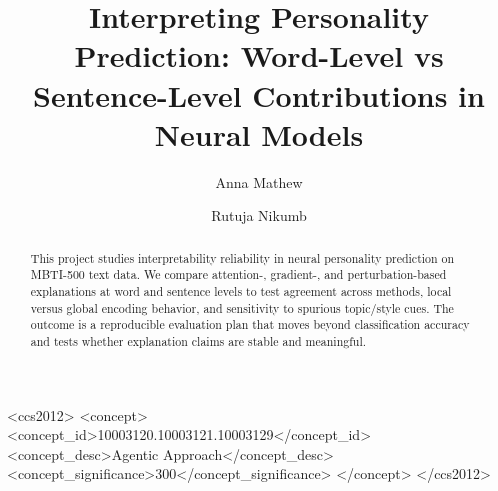 \documentclass[sigplan,screen]{acmart}
\begin{document}
\title[Interpreting Personality Prediction]{Interpreting Personality Prediction: Word-Level vs Sentence-Level Contributions in Neural Models}


\author{Anna Mathew}
\author{Rutuja Nikumb}


\renewcommand{\shortauthors}{Anna Mathew and Rutuja Nikumb}



\begin{abstract}
This project studies interpretability reliability in neural personality prediction on MBTI-500 text data. We compare attention-, gradient-, and perturbation-based explanations at word and sentence levels to test agreement across methods, local versus global encoding behavior, and sensitivity to spurious topic/style cues. The outcome is a reproducible evaluation plan that moves beyond classification accuracy and tests whether explanation claims are stable and meaningful.
\end{abstract}

\begin{CCSXML}
<ccs2012>
 <concept>
  <concept_id>10003120.10003121.10003129</concept_id>
  <concept_desc>Agentic Approach</concept_desc>
  <concept_significance>300</concept_significance>
 </concept>
</ccs2012>
\end{CCSXML}
\end{document}
